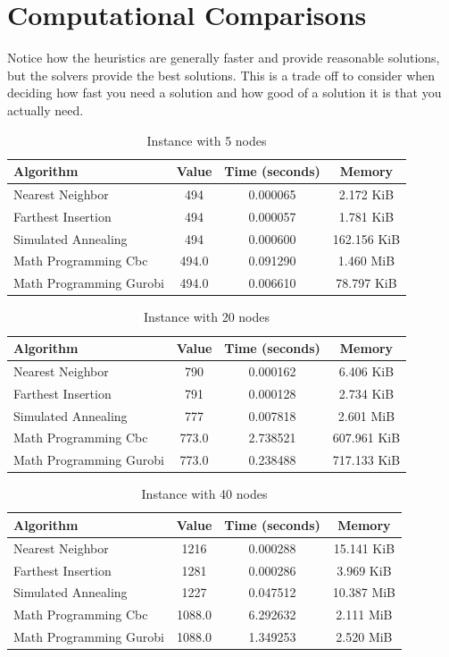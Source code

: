 \section{Computational Comparisons}
Notice how the heuristics are generally faster and provide reasonable solutions, but the solvers provide the best solutions.  This is a trade off to consider when deciding how fast you need a solution and how good of a solution it is that you actually need.  

\begin{table}[h]
\centering
\caption{Instance with 5 nodes}
\begin{tabularx}{\linewidth}{l c c c}
\toprule
Algorithm & Value & Time (seconds) & Memory \\
\midrule
Nearest Neighbor & 494 & 0.000065 & 2.172 KiB \\
Farthest Insertion & 494 & 0.000057 & 1.781 KiB \\
Simulated Annealing & 494 & 0.000600 & 162.156 KiB \\
Math Programming Cbc & 494.0 & 0.091290 & 1.460 MiB \\
Math Programming Gurobi & 494.0 & 0.006610 & 78.797 KiB \\
\bottomrule
\end{tabularx}
\end{table}

\begin{table}[h]
\centering
\caption{Instance with 20 nodes}
\begin{tabularx}{\linewidth}{l c c c}
\toprule
Algorithm & Value & Time (seconds) & Memory \\
\midrule
Nearest Neighbor & 790 & 0.000162 & 6.406 KiB \\
Farthest Insertion & 791 & 0.000128 & 2.734 KiB \\
Simulated Annealing & 777 & 0.007818 & 2.601 MiB \\
Math Programming Cbc & 773.0 & 2.738521 & 607.961 KiB \\
Math Programming Gurobi & 773.0 & 0.238488 & 717.133 KiB \\
\bottomrule
\end{tabularx}
\end{table}

\begin{table}[h]
\centering
\caption{Instance with 40 nodes}
\begin{tabularx}{\linewidth}{l c c c}
\toprule
Algorithm & Value & Time (seconds) & Memory \\
\midrule
Nearest Neighbor & 1216 & 0.000288 & 15.141 KiB \\
Farthest Insertion & 1281 & 0.000286 & 3.969 KiB \\
Simulated Annealing & 1227 & 0.047512 & 10.387 MiB \\
Math Programming Cbc & 1088.0 & 6.292632 & 2.111 MiB \\
Math Programming Gurobi & 1088.0 & 1.349253 & 2.520 MiB \\
\bottomrule
\end{tabularx}
\end{table}

